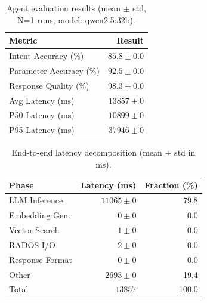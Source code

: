 
\begin{table}[t]
\centering
\caption{Agent evaluation results (mean $\pm$ std, N=1 runs, model: qwen2.5:32b).}
\label{tab:eval-results}
\begin{tabular}{lr}
\toprule
\textbf{Metric} & \textbf{Result} \\
\midrule
Intent Accuracy (\%) & $85.8 \pm 0.0$ \\
Parameter Accuracy (\%) & $92.5 \pm 0.0$ \\
Response Quality (\%) & $98.3 \pm 0.0$ \\
\midrule
Avg Latency (ms) & $13857 \pm 0$ \\
P50 Latency (ms) & $10899 \pm 0$ \\
P95 Latency (ms) & $37946 \pm 0$ \\
\bottomrule
\end{tabular}
\end{table}


\begin{table}[t]
\centering
\caption{End-to-end latency decomposition (mean $\pm$ std in ms).}
\label{tab:latency-decomp}
\begin{tabular}{lrr}
\toprule
\textbf{Phase} & \textbf{Latency (ms)} & \textbf{Fraction (\%)} \\
\midrule
LLM Inference & $11065 \pm 0$ & 79.8 \\
Embedding Gen. & $0 \pm 0$ & 0.0 \\
Vector Search & $1 \pm 0$ & 0.0 \\
RADOS I/O & $2 \pm 0$ & 0.0 \\
Response Format & $0 \pm 0$ & 0.0 \\
Other & $2693 \pm 0$ & 19.4 \\
\midrule
Total & $13857$ & 100.0 \\
\bottomrule
\end{tabular}
\end{table}

